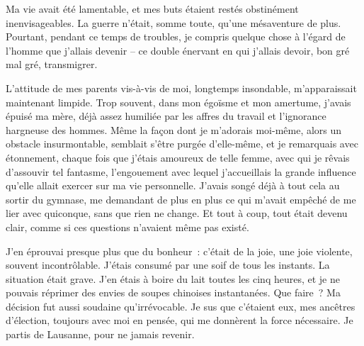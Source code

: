 \documentclass[
  extrafontsizes,
  oneside,
  14pt
]{memoir}
\begin{document}
Ma vie avait été lamentable, et mes buts étaient restés obstinément
inenvisageables. La guerre n'était, somme toute, qu'une mésaventure de plus.
Pourtant, pendant ce temps de troubles, je compris quelque chose à l'égard de
l'homme que j'allais devenir -- ce double énervant en qui j'allais devoir, bon
gré mal gré, transmigrer.

L'attitude de mes parents vis-à-vis de moi, longtemps insondable,
m'apparaissait maintenant limpide. Trop souvent, dans mon égoïsme et mon
amertume, j'avais épuisé ma mère, déjà assez humiliée par les affres du
travail et l'ignorance hargneuse des hommes. Même la façon dont je
m'adorais moi-même, alors un obstacle insurmontable, semblait s'être
purgée d'elle-même, et je remarquais avec étonnement, chaque fois que
j'étais amoureux de telle femme, avec qui je rêvais d'assouvir tel
fantasme, l'engouement avec lequel j'accueillais la grande influence
qu'elle allait exercer sur ma vie personnelle. J'avais songé déjà à tout
cela au sortir du gymnase, me demandant de plus en plus ce qui m'avait
empêché de me lier avec quiconque, sans que rien ne change. Et tout à
coup, tout était devenu clair, comme si ces questions n'avaient même pas
existé.

J'en éprouvai presque plus que du bonheur~: c'était de la joie, une joie
violente, souvent incontrôlable. J'étais consumé par une soif de tous les
instants. La situation était grave. J'en étais à boire du lait toutes les cinq
heures, et je ne pouvais réprimer des envies de soupes chinoises instantanées.
Que faire~? Ma décision fut aussi soudaine qu'irrévocable. Je sus que c'étaient
eux, mes ancêtres d'élection, toujours avec moi en pensée, qui me donnèrent la
force nécessaire. Je partis de Lausanne, pour ne jamais revenir.
\end{document}
